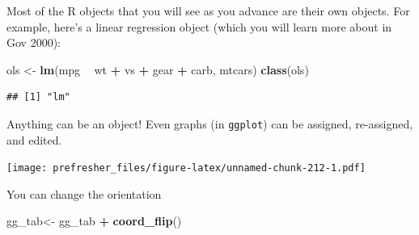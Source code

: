 \documentclass[]{book}
\newenvironment{Shaded}{\begin{snugshade}}{\end{snugshade}}
\newcommand{\DataTypeTok}[1]{\textcolor[rgb]{0.13,0.29,0.53}{#1}}
\newcommand{\KeywordTok}[1]{\textcolor[rgb]{0.13,0.29,0.53}{\textbf{#1}}}
\newcommand{\NormalTok}[1]{#1}
\newcommand{\OperatorTok}[1]{\textcolor[rgb]{0.81,0.36,0.00}{\textbf{#1}}}
\newcommand{\StringTok}[1]{\textcolor[rgb]{0.31,0.60,0.02}{#1}}
\theoremstyle{definition}
\theoremstyle{definition}
\theoremstyle{definition}
\theoremstyle{remark}
\begin{document}
Most of the R objects that you will see as you advance are their own objects. For example, here's a linear regression object (which you will learn more about in Gov 2000):

\begin{Shaded}
\begin{Highlighting}[]
\NormalTok{ols <-}\StringTok{ }\KeywordTok{lm}\NormalTok{(mpg }\OperatorTok{~}\StringTok{ }\NormalTok{wt }\OperatorTok{+}\StringTok{ }\NormalTok{vs }\OperatorTok{+}\StringTok{ }\NormalTok{gear }\OperatorTok{+}\StringTok{ }\NormalTok{carb, mtcars)}
\KeywordTok{class}\NormalTok{(ols)}
\end{Highlighting}
\end{Shaded}

\begin{verbatim}
## [1] "lm"
\end{verbatim}

Anything can be an object! Even graphs (in \texttt{ggplot}) can be assigned, re-assigned, and edited.

\begin{Shaded}
\end{Shaded}

\texttt{[image: prefresher\_files/figure-latex/unnamed-chunk-212-1.pdf]}

You can change the orientation

\begin{Shaded}
\begin{Highlighting}[]
\NormalTok{gg_tab<-}\StringTok{ }\NormalTok{gg_tab }\OperatorTok{+}\StringTok{ }\KeywordTok{coord_flip}\NormalTok{()}
\end{Highlighting}
\end{Shaded}
\end{document}
